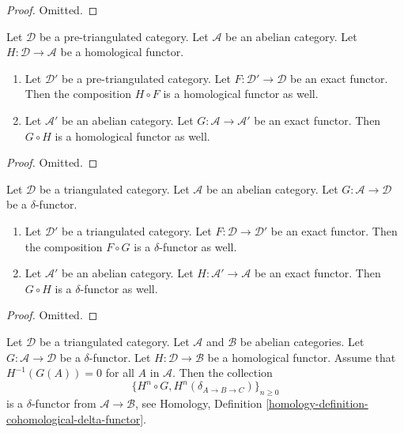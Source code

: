 \begin{proof}
Omitted.
\end{proof}

\begin{lemma}
\label{lemma-exact-compose-homological-functor}
Let $\mathcal{D}$ be a pre-triangulated category.
Let $\mathcal{A}$ be an abelian category.
Let $H : \mathcal{D} \to \mathcal{A}$ be a homological functor.
\begin{enumerate}
\item Let $\mathcal{D}'$ be a pre-triangulated category.
Let $F : \mathcal{D}' \to \mathcal{D}$ be an exact functor.
Then the composition $H \circ F$ is a homological functor as well.
\item Let $\mathcal{A}'$ be an abelian category. Let
$G : \mathcal{A} \to \mathcal{A}'$ be an exact functor.
Then $G \circ H$ is a homological functor as well.
\end{enumerate}
\end{lemma}

\begin{proof}
Omitted.
\end{proof}

\begin{lemma}
\label{lemma-exact-compose-delta-functor}
Let $\mathcal{D}$ be a triangulated category.
Let $\mathcal{A}$ be an abelian category.
Let $G : \mathcal{A} \to \mathcal{D}$ be a $\delta$-functor.
\begin{enumerate}
\item Let $\mathcal{D}'$ be a triangulated category.
Let $F : \mathcal{D} \to \mathcal{D}'$ be an exact functor.
Then the composition $F \circ G$ is a $\delta$-functor as well.
\item Let $\mathcal{A}'$ be an abelian category. Let
$H : \mathcal{A}' \to \mathcal{A}$ be an exact functor.
Then $G \circ H$ is a $\delta$-functor as well.
\end{enumerate}
\end{lemma}

\begin{proof}
Omitted.
\end{proof}

\begin{lemma}
\label{lemma-compose-delta-functor-homological}
Let $\mathcal{D}$ be a triangulated category.
Let $\mathcal{A}$ and $\mathcal{B}$ be abelian categories.
Let $G : \mathcal{A} \to \mathcal{D}$ be a $\delta$-functor.
Let $H : \mathcal{D} \to \mathcal{B}$ be a homological functor.
Assume that $H^{-1}(G(A)) = 0$ for all $A$ in $\mathcal{A}$.
Then the collection
$$
\{H^n \circ G, H^n(\delta_{A \to B \to C})\}_{n \geq 0}
$$
is a $\delta$-functor from $\mathcal{A} \to \mathcal{B}$, see
Homology, Definition \ref{homology-definition-cohomological-delta-functor}.
\end{lemma}

